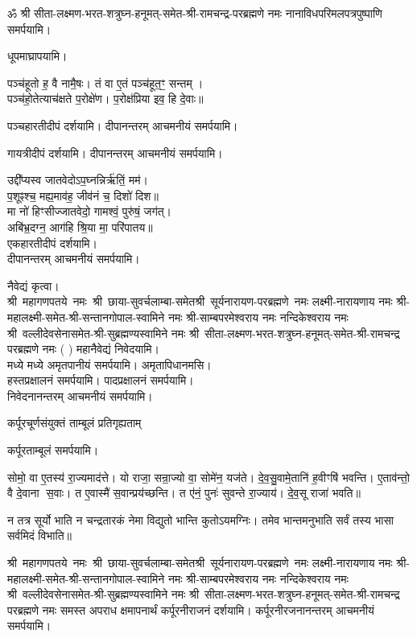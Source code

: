 \begin{center}
ॐ श्री सीता-लक्ष्मण-भरत-शत्रुघ्न-हनूमत्-समेत-श्री-रामचन्द्र-परब्रह्मणे नमः नानाविधपरिमलपत्रपुष्पाणि समर्पयामि। \medskip

\newcommand{\swamine}{श्री~महागणपतये~नमः~श्री~छाया-सुवर्चलाम्बा-समेत\-श्री~सूर्यनारायण-परब्रह्मणे~नमः लक्ष्मी-नारायणाय नमः श्री-महालक्ष्मी-समेत-श्री-सन्तानगोपाल-स्वामिने नमः श्री-साम्बपरमेश्वराय नमः नन्दिकेश्वराय नमः श्री~वल्लीदेवसेनासमेत-श्री-सुब्रह्मण्यस्वामिने नमः श्री~सीता-लक्ष्मण-भरत-शत्रुघ्न-हनूमत्-समेत-श्री-रामचन्द्र परब्रह्मणे नमः}

धूपमाघ्रापयामि।\medskip

पञ्च॑हूतो ह॒ वै नामै॒षः। तं वा ए॒तं पञ्च॑हूत॒ꣳ॒ सन्तम्।\\
पञ्च॑हो॒तेत्याच॑क्षते प॒रोक्षे॑ण। प॒रोक्ष॑प्रिया इव॒ हि दे॒वाः॥

पञ्चहारतीदीपं दर्शयामि। दीपानन्तरम् आचमनीयं समर्पयामि।\medskip

गायत्रीदीपं दर्शयामि। दीपानन्तरम् आचमनीयं समर्पयामि।\medskip

उद्दी᳚प्यस्व जातवेदोऽप॒घ्नन्निर्ऋ॑तिं॒ मम॑।\\
प॒शूꣴश्च॒ मह्य॒माव॑ह॒ जीव॑नं च॒ दिशो॑ दिश॥ \\
मा नो॑ हिꣳसीज्जातवेदो॒ गामश्वं॒ पुरु॑षं॒ जग॑त्।\\
अबि॑भ्र॒दग्न॒ आग॑हि श्रि॒या मा॒ परि॑पातय॥ \\
एकहारतीदीपं दर्शयामि।\\
दीपानन्तरम् आचमनीयं समर्पयामि।\medskip

नैवेद्यं कृत्वा।\\
\swamine{} ( ) महानैवेद्यं निवेदयामि।\\
मध्ये मध्ये अमृतपानीयं समर्पयामि। अमृतापिधानमसि।\\
हस्तप्रक्षालनं समर्पयामि। पादप्रक्षालनं समर्पयामि।\\
निवेदनानन्तरम् आचमनीयं समर्पयामि।\medskip

{कर्पूरचूर्णसंयुक्तं ताम्बूलं प्रतिगृह्यताम्}

कर्पूरताम्बूलं समर्पयामि।\medskip

सोमो॒ वा ए॒तस्य॑ रा॒ज्यमाद॑त्ते।
यो राजा॒ सन्रा॒ज्यो वा॒ सोमे॑न॒ यज॑ते।
दे॒व॒सु॒वामे॒तानि॑ ह॒वीꣳषि॑ भवन्ति।
ए॒ताव॑न्तो॒ वै दे॒वाना स॒वाः।
त ए॒वास्मै॑ स॒वान्प्रय॑च्छन्ति।
त ए॑नं॒ पुनः॑ सुवन्ते रा॒ज्याय॑।
दे॒व॒सू राजा॑ भवति॥

न तत्र सूर्यो भाति न चन्द्रतारकं नेमा विद्युतो भान्ति कुतोऽयमग्निः।
तमेव भान्तमनुभाति सर्वं तस्य भासा सर्वमिदं विभाति॥


\swamine{} समस्त अपराध क्षमापनार्थं कर्पूरनीराजनं दर्शयामि। कर्पूरनीरजनानन्तरम् आचमनीयं समर्पयामि।\medskip



\end{center}
